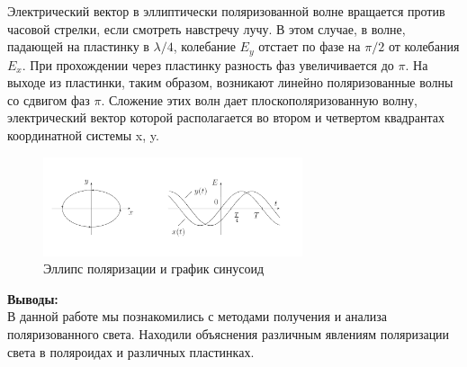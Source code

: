 \documentclass[a4paper, 12pt]{article}%
\begin{document}
	Электрический вектор в эллиптически поляризованной волне вращается против часовой стрелки, если
	смотреть навстречу лучу. В этом случае, в волне, падающей
	на пластинку в $\lambda/4$, колебание
	$E_y$ отстает по фазе на $\pi/2$ от
	колебания $E_x$. При прохождении через пластинку разность фаз увеличивается до $\pi$. На выходе из пластинки, таким образом, возникают линейно поляризованные волны со сдвигом фаз $\pi$. Сложение этих волн дает плоскополяризованную волну, электрический вектор
	которой располагается во втором и четвертом квадрантах координатной системы x, y.
	\begin{figure}[H]
		\begin{center}
			\includegraphics[width = 0.68\textwidth]{ellips}
			\caption{Эллипс поляризации и график синусоид}
		\end{center}
	\end{figure}
	
	\textbf{Выводы: }\\
	В данной работе мы познакомились с методами получения и анализа поляризованного света. Находили объяснения различным явлениям поляризации света в поляроидах и различных пластинках.
	
	
	
	
	
	
	
	
	
	
	
	
	
	
	
	
	
	
	
	
	
\end{document}

